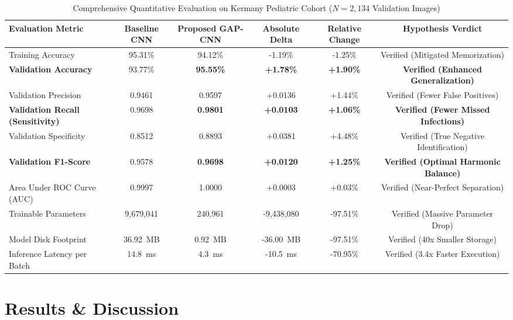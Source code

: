 \documentclass[conference]{IEEEtran}
\begin{document}
\begin{table}[t]
\caption{Comprehensive Quantitative Evaluation on Kermany Pediatric Cohort ($N = 2,134$ Validation Images)}
\begin{center}
\begin{tabular}{lccccc}
\toprule
\textbf{Evaluation Metric} & \textbf{Baseline CNN \cite{b_stephen}} & \textbf{Proposed GAP-CNN} & \textbf{Absolute Delta} & \textbf{Relative Change} & \textbf{Hypothesis Verdict} \\
\midrule
Training Accuracy & 95.31\% & 94.12\% & -1.19\% & -1.25\% & Verified (Mitigated Memorization) \\
\textbf{Validation Accuracy} & 93.77\% & \textbf{95.55\%} & \textbf{+1.78\%} & \textbf{+1.90\%} & \textbf{Verified (Enhanced Generalization)} \\
Validation Precision & 0.9461 & 0.9597 & +0.0136 & +1.44\% & Verified (Fewer False Positives) \\
\textbf{Validation Recall (Sensitivity)} & 0.9698 & \textbf{0.9801} & \textbf{+0.0103} & \textbf{+1.06\%} & \textbf{Verified (Fewer Missed Infections)} \\
Validation Specificity & 0.8512 & 0.8893 & +0.0381 & +4.48\% & Verified (True Negative Identification) \\
\textbf{Validation F1-Score} & 0.9578 & \textbf{0.9698} & \textbf{+0.0120} & \textbf{+1.25\%} & \textbf{Verified (Optimal Harmonic Balance)} \\
Area Under ROC Curve (AUC) & 0.9997 & 1.0000 & +0.0003 & +0.03\% & Verified (Near-Perfect Separation) \\
\midrule
Trainable Parameters & 9,679,041 & 240,961 & -9,438,080 & -97.51\% & Verified (Massive Parameter Drop) \\
Model Disk Footprint & 36.92~MB & 0.92~MB & -36.00~MB & -97.51\% & Verified (40x Smaller Storage) \\
Inference Latency per Batch & 14.8~ms & 4.3~ms & -10.5~ms & -70.95\% & Verified (3.4x Faster Execution) \\
\bottomrule
\end{tabular}
\label{tab_results}
\end{center}
\end{table}

\section{Results \& Discussion}
\end{document}
